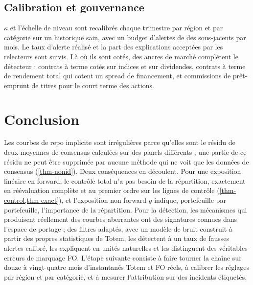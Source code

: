 \subsection{Calibration et gouvernance}
$\kappa$ et l'échelle de niveau sont recalibrés chaque trimestre par région et par catégorie sur un historique sain, avec
un budget d'alertes de \vFPR{} des sous-jacents par mois. Le taux d'alerte réalisé et la part des explications acceptées
par les relecteurs sont suivis. Là où ils sont cotés, des ancres de marché complètent le détecteur : contrats à terme
cotés sur indices et sur dividendes, contrats à terme de rendement total qui cotent un spread de financement, et
commissions de prêt-emprunt de titres pour le court terme des actions.

\section{Conclusion}
Les courbes de repo implicite sont irrégulières parce qu'elles sont le résidu de deux moyennes de consensus calculées sur
des panels différents ; une partie de ce résidu ne peut être supprimée par aucune méthode qui ne voit que les données de
consensus (\cref{thm-nonid}). Deux conséquences en découlent. Pour une exposition linéaire en forward, le contrôle total
n'a pas besoin de la répartition, exactement en réévaluation complète et au premier ordre sur les lignes de contrôle
(\cref{thm-control,thm-exact}), et l'exposition non-forward $g$ indique, portefeuille par portefeuille, l'importance de
la répartition. Pour la détection, les mécanismes qui produisent réellement des courbes aberrantes ont des signatures
connues dans l'espace de portage ; des filtres adaptés, avec un modèle de bruit construit à partir des propres statistiques
de Totem, les détectent à un taux de fausses alertes calibré, les expliquent en unités naturelles et les distinguent des
véritables erreurs de marquage FO. L'étape suivante consiste à faire tourner la chaîne sur douze à vingt-quatre mois
d'instantanés Totem et FO réels, à calibrer les réglages par région et par catégorie, et à mesurer l'attribution sur des
incidents étiquetés.
